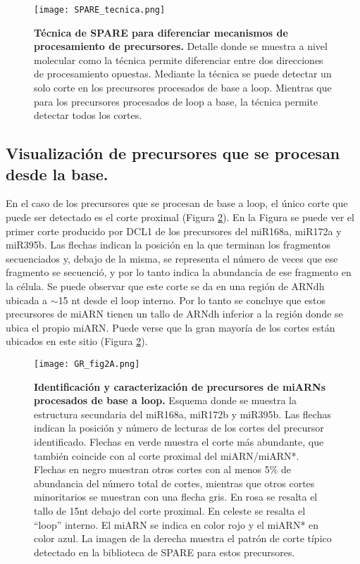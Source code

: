 \begin{figure}[htbp!] 
	\centering    
	\texttt{[image: SPARE\_tecnica.png]}
	\caption[Técnica de SPARE]{
        \textbf{Técnica de SPARE para diferenciar mecanismos de procesamiento de precursores.}
        Detalle donde se muestra a nivel molecular como la técnica permite diferenciar entre dos direcciones de procesamiento opuestas.
        Mediante la técnica se puede detectar un solo corte en los precursores procesados de base a loop.
        Mientras que para los precursores procesados de loop a base, la técnica permite detectar todos los cortes. 
    }
	 \label{fig:SPARE_tecnica}
\end{figure}

\subsection{Visualización de precursores que se procesan desde la base.}

En el caso de los precursores que se procesan de base a loop, el único corte que puede ser detectado es el corte proximal (Figura \ref{fig:GR_fig2A}).
En la Figura se puede ver el primer corte producido por DCL1 de los precursores del miR168a, miR172a y miR395b.
Las flechas indican la posición en la que terminan los fragmentos secuenciados y, debajo de la misma, se representa el número de veces que ese fragmento se secuenció, y por lo tanto indica la abundancia de ese fragmento en la célula.
Se puede observar que este corte se da en una región de ARNdh ubicada a $\sim$15 nt desde el loop interno.
Por lo tanto se concluye que estos precursores de miARN tienen un tallo de ARNdh inferior a la región donde se ubica el propio miARN.
Puede verse que la gran mayoría de los cortes están ubicados en este sitio (Figura \ref{fig:GR_fig2A}).

\begin{figure}[htbp!] 
    \centering    
    \texttt{[image: GR\_fig2A.png]}
    \caption[Identificación y caracterización de precursores de miARNs procesados de base a loop]{
    \textbf{Identificación y caracterización de precursores de miARNs procesados de base a loop.}
            Esquema donde se muestra la estructura secundaria del miR168a, miR172b y miR395b.
            Las flechas indican la posición y número de lecturas de los cortes del precursor identificado.
            Flechas en verde muestra el corte más abundante, que también coincide con al corte proximal del miARN/miARN*.
            Flechas en negro muestran otros cortes con al menos 5\% de abundancia del número total de cortes, mientras que otros cortes minoritarios se muestran con una flecha gris.
            En rosa se resalta el tallo de 15nt debajo del corte proximal.
            En celeste se resalta el ``loop'' interno. 
            El miARN se indica en color rojo y el miARN* en color azul.
            La imagen de la derecha muestra el patrón de corte típico detectado en la biblioteca de SPARE para estos precursores.}
    \label{fig:GR_fig2A}
\end{figure}

